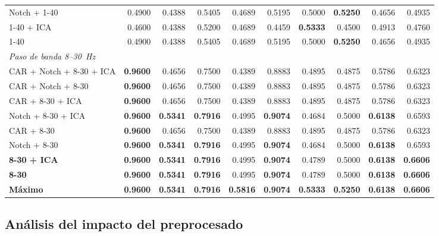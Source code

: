 \begin{table}[p]
{\begin{tabular}{lrrrrrrrr r}
Notch + 1-40             & 0.4900 & 0.4388 & 0.5405 & 0.4689 & 0.5195 & 0.5000 & \textbf{0.5250} & 0.4656 & 0.4935 \\
1-40 + ICA               & 0.4600 & 0.4388 & 0.5200 & 0.4689 & 0.4459 & \textbf{0.5333} & 0.4500 & 0.4913 & 0.4760 \\
1-40                     & 0.4900 & 0.4388 & 0.5405 & 0.4689 & 0.5195 & 0.5000 & \textbf{0.5250} & 0.4656 & 0.4935 \\
\hline
\multicolumn{10}{l}{\textit{Paso de banda 8--30~Hz}} \\[2pt]
CAR + Notch + 8-30 + ICA & \textbf{0.9600} & 0.4656 & 0.7500 & 0.4389 & 0.8883 & 0.4895 & 0.4875 & 0.5786 & 0.6323 \\
CAR + Notch + 8-30       & \textbf{0.9600} & 0.4656 & 0.7500 & 0.4389 & 0.8883 & 0.4895 & 0.4875 & 0.5786 & 0.6323 \\
CAR + 8-30 + ICA         & \textbf{0.9600} & 0.4656 & 0.7500 & 0.4389 & 0.8883 & 0.4895 & 0.4875 & 0.5786 & 0.6323 \\
Notch + 8-30 + ICA       & \textbf{0.9600} & \textbf{0.5341} & \textbf{0.7916} & 0.4995 & \textbf{0.9074} & 0.4684 & 0.5000 & \textbf{0.6138} & 0.6593 \\
CAR + 8-30               & \textbf{0.9600} & 0.4656 & 0.7500 & 0.4389 & 0.8883 & 0.4895 & 0.4875 & 0.5786 & 0.6323 \\
Notch + 8-30             & \textbf{0.9600} & \textbf{0.5341} & \textbf{0.7916} & 0.4995 & \textbf{0.9074} & 0.4684 & 0.5000 & \textbf{0.6138} & 0.6593 \\
\textbf{8-30 + ICA}      & \textbf{0.9600} & \textbf{0.5341} & \textbf{0.7916} & 0.4995 & \textbf{0.9074} & 0.4789 & 0.5000 & \textbf{0.6138} & \textbf{0.6606} \\
\textbf{8-30}            & \textbf{0.9600} & \textbf{0.5341} & \textbf{0.7916} & 0.4995 & \textbf{0.9074} & 0.4789 & 0.5000 & \textbf{0.6138} & \textbf{0.6606} \\
\hline
\textbf{Máximo}          & \textbf{0.9600} & \textbf{0.5341} & \textbf{0.7916} & \textbf{0.5816} & \textbf{0.9074} & \textbf{0.5333} & \textbf{0.5250} & \textbf{0.6138} & \textbf{0.6606} \\
\hline
\end{tabular}
}
\end{table}

\subsection{Análisis del impacto del preprocesado}


